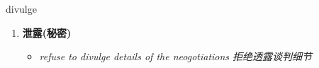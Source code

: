 
\begin{frame}
{\huge divulge}
\begin{center}
\begin{enumerate}\Large
  \item \textbf{泄露(秘密)}
  \begin{itemize}
    \item \em{\Large{refuse to divulge details of the neogotiations 拒绝透露谈判细节}}
  \end{itemize}
\end{enumerate}
\end{center}
\end{frame}
